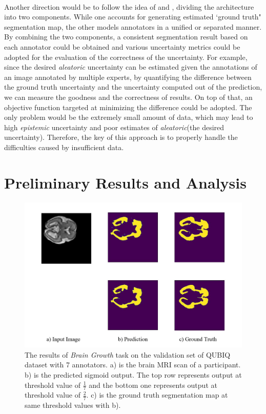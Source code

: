 \documentclass[12pt]{extarticle}
\begin{document}
\paragraph{}
Another direction would be to follow the idea of 
\cite{zhang2020disentangling} and \cite{kohl2019probabilistic}, 
dividing the architecture into two components. 
While one accounts for generating estimated `ground truth" segmentation map,
the other models annotators in a unified or separated manner. By combining 
the two components, a consistent segmentation result based on each annotator 
could be obtained and various uncertainty metrics could be adopted for
the evaluation of the correctness of the uncertainty. For example,
since the desired \textit{aleatoric} uncertainty can be 
estimated given the annotations of an image annotated by multiple experts\cite{qubiq}, 
by quantifying the difference between the ground truth uncertainty and 
the uncertainty computed out of the prediction, we can measure the goodness and the correctness of
results. On top of that, an objective function targeted at 
minimizing the difference could be adopted. The only problem would be the 
extremely small amount of data, which may lead to high \textit{epistemic} uncertainty and 
poor estimates of \textit{aleatoric}(the desired uncertainty). Therefore, the key of this approach 
is to properly handle the difficulties caused by insufficient data.

\section{Preliminary Results and Analysis}
\begin{figure}[ht!]
\centering
\includegraphics[scale=0.28]{fig1.jpg}
\caption{The results of \textit{Brain Growth} task on the validation set of 
QUBIQ dataset with 7 annotators. a) is the brain 
MRI scan of a participant. b) is the predicted sigmoid output. The top row represents output at threshold  
value of $\frac{1}{7}$ and the bottom one represents output at threshold value of $\frac{2}{7}$. c) is the 
ground truth segmentation map at same threshold values with b).}
\label{U-Net}
\end{figure}
\end{document}

